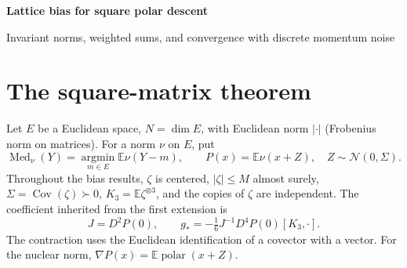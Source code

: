 \documentclass[10pt,letterpaper]{article}
\newcommand{\E}{\mathbb E}
\newcommand{\Med}{\operatorname{Med}}
\newcommand{\argmin}{\operatorname*{argmin}}
\newcommand{\gstar}{g_{\!*}}
\begin{document}
\begin{center}
{\LARGE\bfseries Lattice bias for square polar descent}\par\vspace{5pt}
{\large Invariant norms, weighted sums, and convergence with discrete momentum noise}
\end{center}
\begin{abstract}
For a bounded centered random real $k\times k$ matrix with positive definite covariance, every nuclear median of the mean of $b$ independent copies equals $-\gstar/b+o(b^{-1})$, for every $k\ge3$, including lattice laws. The error admits a power saving of $1/(4k^2-2)$ up to a logarithm. This proves Conjecture 18 of the supplied discrete-bias note. The argument applies to every norm invariant under left and right rotations in these sizes. It controls the Fourier transform of a localized norm through its distributional Laplacian and uses convexity to recover all subgradients, including at atoms. Conditioning on a finite-population sample count also proves the predicted reversal of the first-order bias beyond half sampling, including for lattice populations. A separate convergence theorem identifies the almost-sure limit gradient of exact polar descent with fixed momentum and square-integrable additive noise. It allows finite support, singular covariance and set-valued subgradients. Together the results give the large-batch bias of the actual momentum iteration under discrete square-matrix noise.
\end{abstract}

\section{The square-matrix theorem}

Let $E$ be a Euclidean space, $N=\dim E$, with Euclidean norm $|\cdot|$ (Frobenius norm on matrices). For a norm $\nu$ on $E$, put
\[
 \Med_\nu(Y)=\argmin_{m\in E}\E\nu(Y-m),\qquad
 P(x)=\E\nu(x+Z),\quad Z\sim\mathcal N(0,\Sigma).
\]
Throughout the bias results, $\zeta$ is centered, $|\zeta|\le M$ almost surely, $\Sigma=\operatorname{Cov}(\zeta)\succ0$, $K_3=\E\zeta^{\otimes3}$, and the copies of $\zeta$ are independent. The coefficient inherited from the first extension is
\begin{equation}
 J=D^2P(0),\qquad
 \gstar=-\tfrac16 J^{-1}D^4P(0)[K_3,\cdot].
 \label{eq:coefficient}
\end{equation}
The contraction uses the Euclidean identification of a covector with a vector. For the nuclear norm, $\nabla P(x)=\E\operatorname{polar}(x+Z)$.
\end{document}
